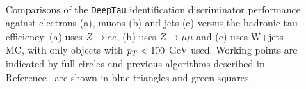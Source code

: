 \begin{figure}[!hbtp]
\centering
     \\
\caption{Comparisons of the \texttt{DeepTau} identification discriminator performance against electrons (a), muons (b) and jets (c) versus the hadronic tau efficiency. (a) uses $Z\rightarrow ee$, (b) uses $Z\rightarrow \mu\mu$ and (c) uses W+jets MC, with only objects with $p_{T}<100$ GeV used. Working points are indicated by full circles and previous algorithms described in Reference~\cite{CMS:2018jrd} are shown in blue triangles and green squares~\cite{CMS:2022prd}.}
\label{fig:deeptau_misid}
\end{figure}
